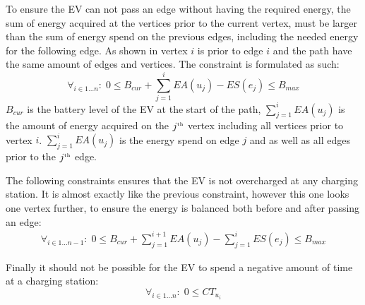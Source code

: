 To ensure the EV can not pass an edge without having the required energy, the sum of energy acquired at the vertices prior to the current vertex, must be larger than the sum of energy spend on the previous edges, including the needed energy for the following edge. As shown in  vertex $i$ is prior to edge $i$ and the path have the same amount of edges and vertices. The constraint is formulated as such:
\begin{equation*}
\forall_{i\in1 \dots n }:\;0 \leq B_{cur} + \sum_{j=1}^{i} EA(u_j) - ES(e_j) \leq B_{max}
\end{equation*}\label{eq:energyreq}
$B_{cur}$ is the battery level of the EV at the start of the path, $ \sum_{j=1}^{i} EA(u_j)$ is the amount of energy acquired on the $j^{\text{\tiny th}}$ vertex including all vertices prior to vertex $i$. $\sum_{j=1}^{i} EA(u_j)$ is the energy spend on edge $j$ and as well as all edges prior to the $j^{\text{\tiny th}}$ edge.

The following constraints ensures that the EV is not overcharged at any charging station. It is almost exactly like the previous constraint, however this one looks one vertex further, to ensure the energy is balanced both before and after passing an edge:
\begin{equation*}
\begin{aligned}
\forall_{i\in1 \dots n-1}:\;0 \leq B_{cur} + \sum_{j=1}^{i+1} EA(u_j) - \sum_{j=1}^{i} ES(e_j) \leq B_{max}
\end{aligned}
\end{equation*}

Finally it should not be possible for the EV to spend a negative amount of time at a charging station:
\begin{equation*}
\forall_{i\in1 \dots n }:\; 0 \leq CT_{u_i}
\end{equation*}
